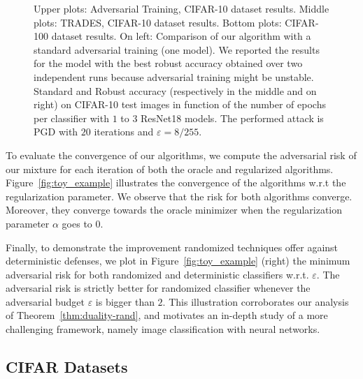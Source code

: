 \begin{figure}[!ht]
\begin{center}
 \caption{Upper plots: Adversarial Training, CIFAR-10 dataset results. Middle plots:  TRADES, CIFAR-10 dataset results. Bottom plots: CIFAR-100 dataset results. {On left}: Comparison of our algorithm with a standard adversarial training (one model). We reported the results for the model with the best robust accuracy obtained over two independent runs because adversarial training might be unstable. Standard and Robust accuracy (respectively in the middle and on right) on CIFAR-10 test images in function of the number of epochs per classifier with $1$ to $3$ ResNet18 models. The performed attack is PGD with $20$ iterations and $\varepsilon=8/255$.}
\label{fig:results_cifar}

\end{center}
\end{figure}

To evaluate the convergence of our algorithms, we compute the adversarial risk of our mixture for each iteration of both the oracle and regularized algorithms. Figure~\ref{fig:toy_example} illustrates the convergence of the algorithms w.r.t the regularization parameter. We observe that the risk for both algorithms converge. Moreover, they converge towards the oracle minimizer when the regularization parameter $\alpha$ goes to $0$.

Finally, to demonstrate the improvement randomized techniques offer against deterministic defenses, we plot in Figure~\ref{fig:toy_example} (right) the minimum adversarial risk for both randomized and deterministic classifiers w.r.t. $\varepsilon$. The adversarial risk is strictly better for randomized classifier whenever the adversarial budget $\varepsilon$ is bigger than $2$. This illustration corroborates our analysis of Theorem~\ref{thm:duality-rand}, and motivates an in-depth study of a more challenging framework, namely image classification with neural networks.


\subsection{CIFAR Datasets}


